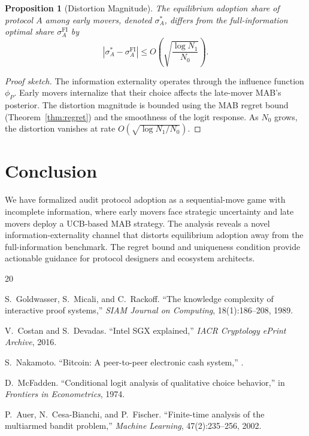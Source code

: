 \documentclass[12pt,a4paper]{article}
\newtheorem{proposition}[theorem]{Proposition}
\begin{document}
\begin{proposition}[Distortion Magnitude]
\label{prop:distortion}
The equilibrium adoption share of protocol $A$ among early movers, denoted $\sigma_A^*$, differs from the full-information optimal share $\sigma_A^{\text{FI}}$ by
\[
|\sigma_A^* - \sigma_A^{\text{FI}}| \leq O\!\left(\sqrt{\frac{\log N_1}{N_0}}\right).
\]
\end{proposition}

\begin{proof}[Proof sketch]
The information externality operates through the influence function $\phi_P$. Early movers internalize that their choice affects the late-mover MAB's posterior. The distortion magnitude is bounded using the MAB regret bound (Theorem~\ref{thm:regret}) and the smoothness of the logit response. As $N_0$ grows, the distortion vanishes at rate $O(\sqrt{\log N_1 / N_0})$.
\end{proof}

\section{Conclusion}

We have formalized audit protocol adoption as a sequential-move game with
incomplete information, where early movers face strategic uncertainty and
late movers deploy a UCB-based MAB strategy. The analysis reveals a novel
information-externality channel that distorts equilibrium adoption away
from the full-information benchmark. The regret bound and uniqueness
condition provide actionable guidance for protocol designers and ecosystem
architects.


\begin{thebibliography}{20}

S.~Goldwasser, S.~Micali, and C.~Rackoff.
\newblock ``The knowledge complexity of interactive proof systems,''
\newblock \emph{SIAM Journal on Computing}, 18(1):186--208, 1989.

V.~Costan and S.~Devadas.
\newblock ``Intel SGX explained,''
\newblock \emph{IACR Cryptology ePrint Archive}, 2016.

S.~Nakamoto.
\newblock ``Bitcoin: A peer-to-peer electronic cash system,''
.

D.~McFadden.
\newblock ``Conditional logit analysis of qualitative choice behavior,''
\newblock in \emph{Frontiers in Econometrics}, 1974.

P.~Auer, N.~Cesa-Bianchi, and P.~Fischer.
\newblock ``Finite-time analysis of the multiarmed bandit problem,''
\newblock \emph{Machine Learning}, 47(2):235--256, 2002.

\end{thebibliography}
\end{document}
